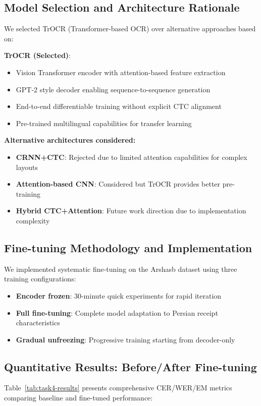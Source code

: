 \documentclass[11pt,a4paper]{article}
\begin{document}
\subsection{Model Selection and Architecture Rationale}
We selected TrOCR (Transformer-based OCR) over alternative approaches based on:

\textbf{TrOCR (Selected)}:
\begin{itemize}
  \item Vision Transformer encoder with attention-based feature extraction
  \item GPT-2 style decoder enabling sequence-to-sequence generation
  \item End-to-end differentiable training without explicit CTC alignment
  \item Pre-trained multilingual capabilities for transfer learning
\end{itemize}

\textbf{Alternative architectures considered:}
\begin{itemize}
  \item \textbf{CRNN+CTC}: Rejected due to limited attention capabilities for complex layouts
  \item \textbf{Attention-based CNN}: Considered but TrOCR provides better pre-training
  \item \textbf{Hybrid CTC+Attention}: Future work direction due to implementation complexity
\end{itemize}

\subsection{Fine-tuning Methodology and Implementation}
We implemented systematic fine-tuning on the Arshasb dataset using three training configurations:
\begin{itemize}
  \item \textbf{Encoder frozen}: 30-minute quick experiments for rapid iteration
  \item \textbf{Full fine-tuning}: Complete model adaptation to Persian receipt characteristics
  \item \textbf{Gradual unfreezing}: Progressive training starting from decoder-only
\end{itemize}

\subsection{Quantitative Results: Before/After Fine-tuning}
Table~\ref{tab:task4-results} presents comprehensive CER/WER/EM metrics comparing baseline and fine-tuned performance:
\end{document}
